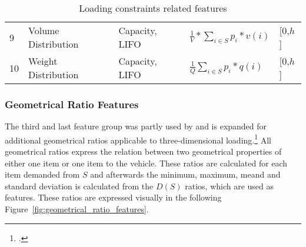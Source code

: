 \begin{table}[ht]
\begin{tabular}{@{}P{0.08\textwidth}P{0.16\textwidth}P{0.26\textwidth}P{0.28\textwidth}@{}P{0.1\textwidth}@{}}
        9  & Volume Distribution                                                                             & Capacity, \gls{LIFO}   & $\displaystyle\frac{1}{V}*\sum_{i \in S}p_i * v(i)$                                               & [0,$h$] \\
        10 & Weight Distribution                                                                             & Capacity, \gls{LIFO}   & $\displaystyle\frac{1}{Q}\sum_{i \in S}p_i * q(i)$                                                & [0,$h$] \\
        \bottomrule
    \end{tabular}
    \caption{Loading constraints related features}
    \label{tab:loading_constraints_features}
\end{table}

\clearpage

\subsubsection{Geometrical Ratio Features}
The third and last feature group
was partly used by \cite{zhang_learning-based_2022} and is expanded for additional geometrical ratios applicable to three-dimensional loading.\footcite[cf.][p. 14]{zhang_learning-based_2022}
All geometrical ratios express the relation between two geometrical properties of either one item or one item to the vehicle. These ratios
are calculated for each item demanded from $S$ and afterwards the minimum, maximum, meand and standard deviation is calculated
from the $D(S)$ ratios, which are used as features. These ratios are expressed visually in the following Figure~\ref{fig:geometrical_ratio_features}.


